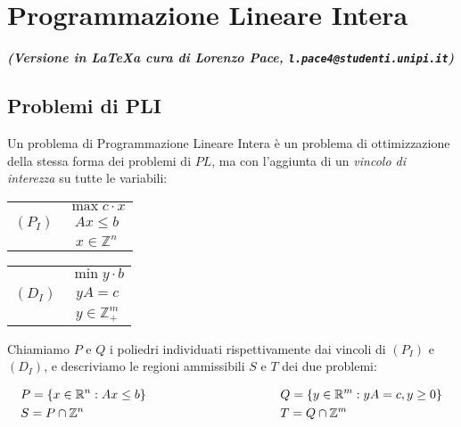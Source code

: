 \documentclass[a4paper,11pt]{book}
\newcommand{\reals}{\mathbb{R}}
\newcommand{\integers}{\mathbb{Z}}
\theoremstyle{break}
\begin{document}
\chapter{Programmazione Lineare Intera}{\normalsize \emph{\bfseries(Versione in \LaTeX \hspace{1mm}a cura di Lorenzo Pace, \texttt{l.pace4@studenti.unipi.it})}}\bigskip

\section{Problemi di PLI}
Un problema di Programmazione Lineare Intera è un problema di ottimizzazione della stessa forma dei problemi di $PL$, ma con l'aggiunta di un \emph{vincolo di interezza} su tutte le variabili:

\begin{multicols}{2}
 \begin{center}
 \begin{tabular}{c c}
    &$\max c\cdot x$\\
    
   $(P_I)$ &$Ax \leq b$\\
    
    &$x \in \integers^n$

 \end{tabular}

     \end{center}

 \begin{center}
   \begin{tabular}{c c}
    &$\min y\cdot b$\\
    
   $(D_I)$ &$yA = c$\\
    
    &$y \in \integers^m_+$

 \end{tabular}
 \end{center}

 
\end{multicols}

Chiamiamo $P$ e $Q$ i poliedri individuati rispettivamente dai vincoli di $(P_I)$ e $(D_I)$, e descriviamo le regioni ammissibili $S$ e $T$ dei due problemi:

 \[\begin{aligned}
&P = \{x \in \reals^n : Ax \leq b\}\\
 &S = P \cap \integers^n
   \end{aligned} \hspace{3.8cm}\begin{aligned}
&Q = \{y \in \reals^m : yA = c, y \geq 0\}\\
  &T = Q \cap \integers^m
   \end{aligned}
\]\smallskip
\end{document}

